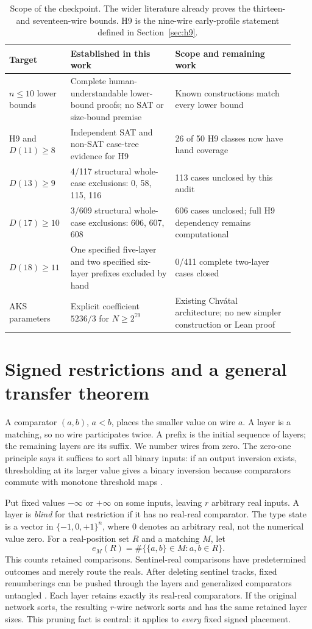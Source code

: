 \documentclass[11pt]{article}
\begin{document}
\begin{table}[ht]
\centering\small
\begin{tabular}{@{}p{0.18\linewidth}p{0.35\linewidth}p{0.40\linewidth}@{}}
\toprule
Target & Established in this work & Scope and remaining work\\\midrule
$n\le10$ lower bounds & Complete human-understandable lower-bound proofs; no SAT or size-bound premise & Known constructions match every lower bound\\
H9 and $D(11)\ge8$ & Independent SAT and non-SAT case-tree evidence for H9 & 26 of 50 H9 classes now have hand coverage\\
$D(13)\ge9$ & 4/117 structural whole-case exclusions: 0, 58, 115, 116 & 113 cases unclosed by this audit\\
$D(17)\ge10$ & 3/609 structural whole-case exclusions: 606, 607, 608 & 606 cases unclosed; full H9 dependency remains computational\\
$D(18)\ge11$ & One specified five-layer and two specified six-layer prefixes excluded by hand & 0/411 complete two-layer cases closed\\
AKS parameters & Explicit coefficient $5236/3$ for $N\ge2^{79}$ & Existing Chv\'atal architecture; no new simpler construction or Lean proof\\
\bottomrule
\end{tabular}
\caption{Scope of the checkpoint. The wider literature already proves the thirteen- and seventeen-wire bounds. H9 is the nine-wire early-profile statement defined in Section~\ref{sec:h9}.}\label{tab:status}
\end{table}

\section{Signed restrictions and a general transfer theorem}\label{sec:transfer}
A comparator $(a,b)$, $a<b$, places the smaller value on wire $a$. A layer is a matching, so no wire participates twice. A prefix is the initial sequence of layers; the remaining layers are its suffix. We number wires from zero. The zero-one principle says it suffices to sort all binary inputs: if an output inversion exists, thresholding at its larger value gives a binary inversion because comparators commute with monotone threshold maps \cite{knuth}.

Put fixed values $-\infty$ or $+\infty$ on some inputs, leaving $r$ arbitrary real inputs. A layer is \emph{blind} for that restriction if it has no real-real comparator. The type state is a vector in $\{-1,0,+1\}^n$, where $0$ denotes an arbitrary real, not the numerical value zero. For a real-position set $R$ and a matching $M$, let
\[
 e_M(R)=\#\{\{a,b\}\in M:a,b\in R\}.
\]
This counts retained comparisons. Sentinel-real comparisons have predetermined outcomes and merely route the reals. After deleting sentinel tracks, fixed renumberings can be pushed through the layers and generalized comparators untangled \cite{knuth}. Each layer retains exactly its real-real comparators. If the original network sorts, the resulting $r$-wire network sorts and has the same retained layer sizes. This pruning fact is central: it applies to \emph{every} fixed signed placement.
\end{document}
